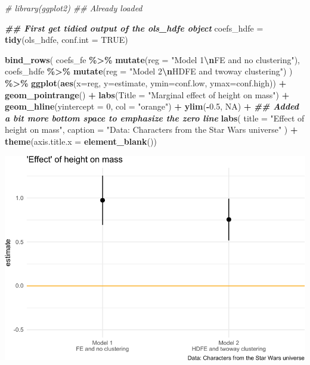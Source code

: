 \documentclass[
]{article}
\newenvironment{Shaded}{\begin{snugshade}}{\end{snugshade}}
\newcommand{\AttributeTok}[1]{\textcolor[rgb]{0.13,0.29,0.53}{#1}}
\newcommand{\CommentTok}[1]{\textcolor[rgb]{0.56,0.35,0.01}{\textit{#1}}}
\newcommand{\ConstantTok}[1]{\textcolor[rgb]{0.56,0.35,0.01}{#1}}
\newcommand{\DecValTok}[1]{\textcolor[rgb]{0.00,0.00,0.81}{#1}}
\newcommand{\DocumentationTok}[1]{\textcolor[rgb]{0.56,0.35,0.01}{\textbf{\textit{#1}}}}
\newcommand{\FloatTok}[1]{\textcolor[rgb]{0.00,0.00,0.81}{#1}}
\newcommand{\FunctionTok}[1]{\textcolor[rgb]{0.13,0.29,0.53}{\textbf{#1}}}
\newcommand{\NormalTok}[1]{#1}
\newcommand{\OtherTok}[1]{\textcolor[rgb]{0.56,0.35,0.01}{#1}}
\newcommand{\SpecialCharTok}[1]{\textcolor[rgb]{0.81,0.36,0.00}{\textbf{#1}}}
\newcommand{\StringTok}[1]{\textcolor[rgb]{0.31,0.60,0.02}{#1}}
\begin{document}
\begin{Shaded}
\begin{Highlighting}[]
\CommentTok{\# library(ggplot2) \#\# Already loaded}

\DocumentationTok{\#\# First get tidied output of the ols\_hdfe object}
\NormalTok{coefs\_hdfe }\OtherTok{=} \FunctionTok{tidy}\NormalTok{(ols\_hdfe, }\AttributeTok{conf.int =} \ConstantTok{TRUE}\NormalTok{)}

\FunctionTok{bind\_rows}\NormalTok{(}
\NormalTok{  coefs\_fe }\SpecialCharTok{\%\textgreater{}\%} \FunctionTok{mutate}\NormalTok{(}\AttributeTok{reg =} \StringTok{"Model 1}\SpecialCharTok{\textbackslash{}n}\StringTok{FE and no clustering"}\NormalTok{),}
\NormalTok{  coefs\_hdfe }\SpecialCharTok{\%\textgreater{}\%} \FunctionTok{mutate}\NormalTok{(}\AttributeTok{reg =} \StringTok{"Model 2}\SpecialCharTok{\textbackslash{}n}\StringTok{HDFE and twoway clustering"}\NormalTok{)}
\NormalTok{  ) }\SpecialCharTok{\%\textgreater{}\%}
  \FunctionTok{ggplot}\NormalTok{(}\FunctionTok{aes}\NormalTok{(}\AttributeTok{x=}\NormalTok{reg, }\AttributeTok{y=}\NormalTok{estimate, }\AttributeTok{ymin=}\NormalTok{conf.low, }\AttributeTok{ymax=}\NormalTok{conf.high)) }\SpecialCharTok{+}
  \FunctionTok{geom\_pointrange}\NormalTok{() }\SpecialCharTok{+}
  \FunctionTok{labs}\NormalTok{(}\AttributeTok{Title =} \StringTok{"Marginal effect of height on mass"}\NormalTok{) }\SpecialCharTok{+}
  \FunctionTok{geom\_hline}\NormalTok{(}\AttributeTok{yintercept =} \DecValTok{0}\NormalTok{, }\AttributeTok{col =} \StringTok{"orange"}\NormalTok{) }\SpecialCharTok{+}
  \FunctionTok{ylim}\NormalTok{(}\SpecialCharTok{{-}}\FloatTok{0.5}\NormalTok{, }\ConstantTok{NA}\NormalTok{) }\SpecialCharTok{+} \DocumentationTok{\#\# Added a bit more bottom space to emphasize the zero line}
  \FunctionTok{labs}\NormalTok{(}
    \AttributeTok{title =} \StringTok{"\textquotesingle{}Effect\textquotesingle{} of height on mass"}\NormalTok{,}
    \AttributeTok{caption =} \StringTok{"Data: Characters from the Star Wars universe"}
\NormalTok{    ) }\SpecialCharTok{+}
  \FunctionTok{theme}\NormalTok{(}\AttributeTok{axis.title.x =} \FunctionTok{element\_blank}\NormalTok{())}
\end{Highlighting}
\end{Shaded}

\includegraphics{11-panel-twfe_files/figure-latex/fe_mods_compared-1.pdf}
\end{document}
